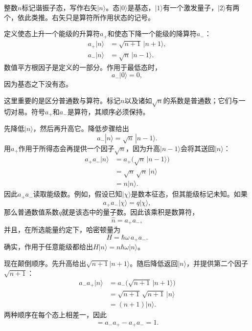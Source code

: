 整数\(n\)标记谐振子态，写作右矢\(|n\rangle\)。态\(|0\rangle\)是基态，\(|1\rangle\)有一个激发量子，\(|2\rangle\)有两个，依此类推。右矢只是算符所作用状态的记号。

定义使态上升一个能级的升算符\(a_+\)和使态下降一个能级的降算符\(a_-\)：
\begin{align}
a_+|n\rangle &= \sqrt{n+1}\,|n+1\rangle,\\
a_-|n\rangle &= \sqrt{n}\,|n-1\rangle.
\end{align}
数值平方根因子是定义的一部分。作用于最低态时，
\begin{equation}
a_-|0\rangle=0,
\end{equation}
因为基态之下没有态。

这里重要的是区分普通数与算符。标记\(n\)以及诸如\(\sqrt n\)的系数是普通数；它们与一切对易。符号\(a_+\)和\(a_-\)是算符，其顺序必须保持。

先降低\(|n\rangle\)，然后再升高它。降低步骤给出
\begin{equation}
a_-|n\rangle=\sqrt n\,|n-1\rangle.
\end{equation}
用\(a_+\)作用于所得态会再提供一个因子\(\sqrt n\)，因为升高\(|n-1\rangle\)会将其送回\(|n\rangle\)：
\begin{align}
a_+a_-|n\rangle
&=a_+\bigl(\sqrt n\,|n-1\rangle\bigr)\\
&=\sqrt n\,\sqrt n\,|n\rangle\\
&=n|n\rangle.
\end{align}
因此\(a_+a_-\)读取能级数。例如，假设已知\(|\chi\rangle\)是数本征态，但其能级标记未知。如果
\begin{equation}
a_+a_-|\chi\rangle=q|\chi\rangle,
\end{equation}
那么普通数值系数\(q\)就是该态中的量子数。因此该乘积是数算符，
\begin{equation}
\hat n=a_+a_-,
\end{equation}
并且，在所选能量约定下，哈密顿量为
\begin{equation}
H=\hbar\omega\,a_+a_-.
\end{equation}
确实，作用于任意能级都给出\(H|n\rangle=n\hbar\omega|n\rangle\)。

现在颠倒顺序。先升高给出\(\sqrt{n+1}|n+1\rangle\)。随后降低返回\(|n\rangle\)，并提供第二个因子\(\sqrt{n+1}\)：
\begin{align}
a_-a_+|n\rangle
&=a_-\bigl(\sqrt{n+1}\,|n+1\rangle\bigr)\\
&=\sqrt{n+1}\,\sqrt{n+1}\,|n\rangle\\
&=(n+1)|n\rangle.
\end{align}
两种顺序在每个态上相差一，因此
\begin{equation}
[a_-,a_+]=a_-a_+-a_+a_-=1.
\end{equation}

